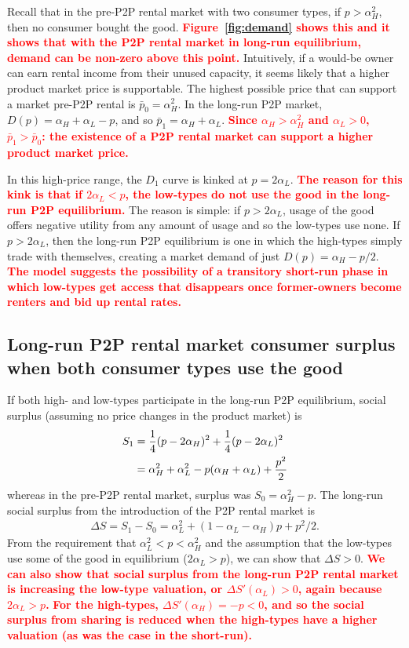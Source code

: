 \documentclass[11pt]{article}
\newcommand{\important}[1]{\textcolor{red}{\textbf{#1}}}
\newcommand{\important}[1]{#1}
\begin{document}
Recall that in the pre-P2P rental market with two consumer types, if $p > \alpha_H^2$, then no consumer bought the good. 
\important{Figure~\ref{fig:demand} shows this and it shows that with the P2P rental market in long-run equilibrium, demand can be non-zero above this point.}  
Intuitively, if a would-be owner can earn rental income from their unused capacity, it seems likely that a higher product market price is supportable. 
The highest possible price that can support a market pre-P2P rental is $\bar{p}_0 = \alpha_H^2$.  
In the long-run P2P market, $D(p) = \alpha_H + \alpha_L - p$, and so $\bar{p}_{1} = \alpha_H + \alpha_L$. 
\important{Since $\alpha_H > \alpha_H^2$ and $\alpha_L > 0$, $\bar{p}_1 > \bar{p}_0$: the existence of a P2P rental market can support a higher product market price.} 

In this high-price range, the $D_1$ curve is kinked at $p = 2\alpha_L$. 
\important{The reason for this kink is that if $2\alpha_L < p$, the low-types do not use the good in the long-run P2P equilibrium.} 
The reason is simple: if $p > 2\alpha_L$, usage of the good offers negative utility from any amount of usage and so the low-types use none. 
If $p > 2 \alpha_L$, then the long-run P2P equilibrium is one in which the high-types simply trade with themselves, creating a market demand of just $D(p) = \alpha_H - p/2$. 
\important{The model suggests the possibility of a transitory short-run phase in which low-types get access that disappears once former-owners become renters and bid up rental rates.} 

\subsection{Long-run P2P rental market consumer surplus when both consumer types use the good} 
If both high- and low-types participate in the long-run P2P equilibrium, social surplus (assuming no price changes in the product market) is 
\begin{align} 
S_1 & = \frac{1}{4}(p - 2\alpha_H)^2 + \frac{1}{4}(p - 2\alpha_L)^2 \notag \\
    & = \alpha_H^2 + \alpha_L^2 - p(\alpha_H + \alpha_L) + \frac{p^2}{2} \notag 
\end{align} 
whereas in the pre-P2P rental market, surplus was $S_0 = \alpha_H^2 - p$.  
The long-run social surplus from the introduction of the P2P rental market is  
\begin{align}
\Delta S = S_1 - S_0 = \alpha_L^2 + (1 - \alpha_L - \alpha_H)p + p^2/2.  
\end{align} 
From the requirement that $\alpha_L^2 < p < \alpha_H^2$ and the assumption that the low-types use some of the good in equilibrium ($2 \alpha_L > p$), we can show that $\Delta S > 0$. 
\important{We can also show that social surplus from the long-run P2P rental market is increasing the low-type valuation, or $\Delta S'(\alpha_L) > 0$, again because $2\alpha_L > p$.}
\important{For the high-types, $\Delta S'(\alpha_H) = -p < 0$, and so the social surplus from sharing is 
reduced when the high-types have a higher valuation (as was the case in the short-run).}
\end{document}
